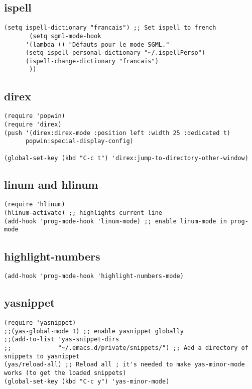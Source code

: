 \documentclass[11pt]{article}
\begin{document}
\subsection{ispell}
\label{sec-2-7}
\begin{verbatim}
(setq ispell-dictionary "francais") ;; Set ispell to french
       (setq sgml-mode-hook
      '(lambda () "Défauts pour le mode SGML."
      (setq ispell-personal-dictionary "~/.ispellPerso")
      (ispell-change-dictionary "francais")
       ))
\end{verbatim}
\subsection{direx}
\label{sec-2-8}
\begin{verbatim}
(require 'popwin)
(require 'direx)
(push '(direx:direx-mode :position left :width 25 :dedicated t)
      popwin:special-display-config)

(global-set-key (kbd "C-c t") 'direx:jump-to-directory-other-window)
\end{verbatim}
\subsection{linum and hlinum}
\label{sec-2-9}
\begin{verbatim}
(require 'hlinum)
(hlinum-activate) ;; highlights current line
(add-hook 'prog-mode-hook 'linum-mode) ;; enable linum-mode in prog-mode
\end{verbatim}
\subsection{highlight-numbers}
\label{sec-2-10}
\begin{verbatim}
(add-hook 'prog-mode-hook 'highlight-numbers-mode)
\end{verbatim}
\subsection{yasnippet}
\label{sec-2-11}
\begin{verbatim}
(require 'yasnippet)
;;(yas-global-mode 1) ;; enable yasnippet globally
;;(add-to-list 'yas-snippet-dirs
;;             "~/.emacs.d/private/snippets/") ;; Add a directory of snippets to yasnippet
(yas/reload-all) ;; Reload all ; it's needed to make yas-minor-mode works (to get the loaded snippets)
(global-set-key (kbd "C-c y") 'yas-minor-mode)
\end{verbatim}
\end{document}
